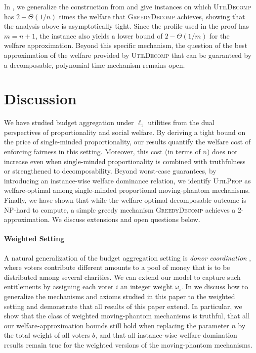 \documentclass[11pt]{article}
\newcommand{\UtP}{\textsc{UtilProp} }
\newcommand{\GrdDec}{\textsc{GreedyDecomp} }
\newcommand{\UtDec}{\textsc{UtilDecomp} }
\begin{document}
In , we generalize the construction from  and give instances on which \UtDec has $2-\Theta(1/n)$ times the welfare that \GrdDec achieves, showing that the analysis above is asymptotically tight. Since the profile used in the proof has $m = n+1$, the instance also yields a lower bound of $2-\Theta(1/m)$ for the welfare approximation.
Beyond this specific mechanism, the question of the best approximation of the welfare provided by \UtDec that can be guaranteed by a decomposable, polynomial-time mechanism remains open.


    
    

    




\section{Discussion}\label{sec:discussion}

We have studied budget aggregation under $\ell_1$ utilities from the dual perspectives of proportionality and social welfare. By deriving a tight bound on the price of single-minded proportionality, our results quantify the welfare cost of enforcing fairness in this setting. Moreover, this cost (in terms of $n$) does not increase even when single-minded proportionality is combined with truthfulness or strengthened to decomposability. Beyond worst-case guarantees, by introducing an instance-wise welfare dominance relation, we identify \UtP as welfare-optimal among single-minded proportional moving-phantom mechanisms. Finally, we have shown that while the welfare-optimal decomposable outcome is NP-hard to compute, a simple greedy mechanism \GrdDec achieves a 2-approximation. We discuss extensions and open questions below. %

\paragraph{Weighted Setting} A natural generalization of the budget aggregation setting is \textit{donor coordination} \citep{brandl2021distribution,brandt2023balanced}, where voters contribute different amounts to a pool of money that is to be distributed among several charities. We can extend our model to capture such entitlements by assigning each voter $i$ an integer weight $\omega_i$. In  we discuss how to generalize the mechanisms and axioms studied in this paper to the weighted setting and demonstrate that all results of this paper extend. In particular, we show that the class of weighted moving-phantom mechanisms is truthful, that all our welfare-approximation bounds still hold when replacing the parameter $n$ by the total weight of all voters $b$, and that all instance-wise welfare domination results remain true for the weighted versions of the moving-phantom mechanisms.
\end{document}
